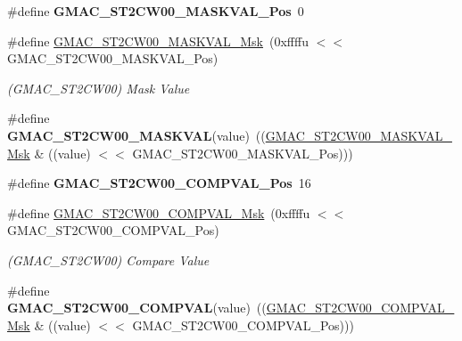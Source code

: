 \begin{DoxyCompactItemize}
\mbox{\label{group__SAME70__GMAC_ga5e9a9354ff32c27fff15670b9102ef44}} 
\#define {\bfseries G\+M\+A\+C\+\_\+\+S\+T2\+C\+W00\+\_\+\+M\+A\+S\+K\+V\+A\+L\+\_\+\+Pos}~0
\item 
\mbox{\label{group__SAME70__GMAC_ga921e08a338e2caa2e273336374d631bc}} 
\#define \mbox{\hyperlink{group__SAME70__GMAC_ga921e08a338e2caa2e273336374d631bc}{G\+M\+A\+C\+\_\+\+S\+T2\+C\+W00\+\_\+\+M\+A\+S\+K\+V\+A\+L\+\_\+\+Msk}}~(0xffffu $<$$<$ G\+M\+A\+C\+\_\+\+S\+T2\+C\+W00\+\_\+\+M\+A\+S\+K\+V\+A\+L\+\_\+\+Pos)
\begin{DoxyCompactList}\small\item\em (G\+M\+A\+C\+\_\+\+S\+T2\+C\+W00) Mask Value \end{DoxyCompactList}\item 
\mbox{\label{group__SAME70__GMAC_ga6ea1a534f2e31888c2a415fb516a5ad3}} 
\#define {\bfseries G\+M\+A\+C\+\_\+\+S\+T2\+C\+W00\+\_\+\+M\+A\+S\+K\+V\+AL}(value)~((\mbox{\hyperlink{group__SAMV71__GMAC_ga921e08a338e2caa2e273336374d631bc}{G\+M\+A\+C\+\_\+\+S\+T2\+C\+W00\+\_\+\+M\+A\+S\+K\+V\+A\+L\+\_\+\+Msk}} \& ((value) $<$$<$ G\+M\+A\+C\+\_\+\+S\+T2\+C\+W00\+\_\+\+M\+A\+S\+K\+V\+A\+L\+\_\+\+Pos)))
\item 
\mbox{\label{group__SAME70__GMAC_ga0e7d568d3dfbe2b28ea917847ad715ad}} 
\#define {\bfseries G\+M\+A\+C\+\_\+\+S\+T2\+C\+W00\+\_\+\+C\+O\+M\+P\+V\+A\+L\+\_\+\+Pos}~16
\item 
\mbox{\label{group__SAME70__GMAC_ga9e15226a0db8a1f3e35ab499ef9c9971}} 
\#define \mbox{\hyperlink{group__SAME70__GMAC_ga9e15226a0db8a1f3e35ab499ef9c9971}{G\+M\+A\+C\+\_\+\+S\+T2\+C\+W00\+\_\+\+C\+O\+M\+P\+V\+A\+L\+\_\+\+Msk}}~(0xffffu $<$$<$ G\+M\+A\+C\+\_\+\+S\+T2\+C\+W00\+\_\+\+C\+O\+M\+P\+V\+A\+L\+\_\+\+Pos)
\begin{DoxyCompactList}\small\item\em (G\+M\+A\+C\+\_\+\+S\+T2\+C\+W00) Compare Value \end{DoxyCompactList}\item 
\mbox{\label{group__SAME70__GMAC_ga935fe8c271a3b1fd8cc7b23bb2df6444}} 
\#define {\bfseries G\+M\+A\+C\+\_\+\+S\+T2\+C\+W00\+\_\+\+C\+O\+M\+P\+V\+AL}(value)~((\mbox{\hyperlink{group__SAMV71__GMAC_ga9e15226a0db8a1f3e35ab499ef9c9971}{G\+M\+A\+C\+\_\+\+S\+T2\+C\+W00\+\_\+\+C\+O\+M\+P\+V\+A\+L\+\_\+\+Msk}} \& ((value) $<$$<$ G\+M\+A\+C\+\_\+\+S\+T2\+C\+W00\+\_\+\+C\+O\+M\+P\+V\+A\+L\+\_\+\+Pos)))

\end{DoxyCompactItemize}
